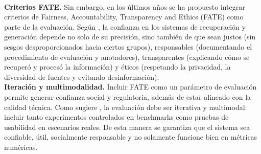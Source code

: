 \mbox{}\\
\noindent\textbf{Criterios FATE.} Sin embargo, en los últimos años se ha propuesto integrar criterios de Fairness, Accountability, Transparency and Ethics (FATE) como parte de la evaluación. Según \textcite{bernard2025fate}, la confianza en los sistemas de recuperación y generación depende no solo de su precisión, sino también de que sean justos (sin sesgos desproporcionados hacia ciertos grupos), responsables (documentando el procedimiento de evaluación y anotadores), transparentes (explicando cómo se recuperó y procesó la información) y éticos (respetando la privacidad, la diversidad de fuentes y evitando desinformación).  
\mbox{}\\
\noindent\textbf{Iteración y multimodalidad.} Incluir FATE como un parámetro de evaluación permite generar confianza social y regulatoria, además de estar alineado con la calidad técnica. Como sugiere \textcite{ramdurai2025llm}, la evaluación debe ser iterativa y multimodal: incluir tanto experimentos controlados en benchmarks como pruebas de usabilidad en escenarios reales. De esta manera se garantiza que el sistema sea confiable, útil, socialmente responsable y no solamente funcione bien en métricas numéricas.  

